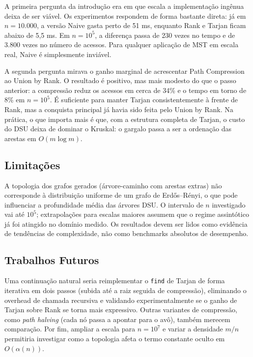 \documentclass[12pt]{article}
\begin{document}
A primeira pergunta da introdução era em que escala a implementação ingênua deixa de ser viável. Os experimentos respondem de forma bastante direta: já em $n = 10.000$, a versão Naive gasta perto de 51 ms, enquanto Rank e Tarjan ficam abaixo de 5,5 ms. Em $n = 10^5$, a diferença passa de 230 vezes no tempo e de 3.800 vezes no número de acessos. Para qualquer aplicação de MST em escala real, Naive é simplesmente inviável.

A segunda pergunta mirava o ganho marginal de acrescentar Path Compression ao Union by Rank. O resultado é positivo, mas mais modesto do que o passo anterior: a compressão reduz os acessos em cerca de 34\% e o tempo em torno de 8\% em $n = 10^5$. É suficiente para manter Tarjan consistentemente à frente de Rank, mas a conquista principal já havia sido feita pelo Union by Rank. Na prática, o que importa mais é que, com a estrutura completa de Tarjan, o custo do DSU deixa de dominar o Kruskal: o gargalo passa a ser a ordenação das arestas em $O(m \log m)$.

\subsection*{Limitações}

A topologia dos grafos gerados (árvore-caminho com arestas extras) não corresponde à distribuição uniforme de um grafo de Erd\H{o}s--R\'enyi, o que pode influenciar a profundidade média das árvores DSU. O intervalo de $n$ investigado vai até $10^5$; extrapolações para escalas maiores assumem que o regime assintótico já foi atingido no domínio medido. Os resultados devem ser lidos como evidência de tendências de complexidade, não como benchmarks absolutos de desempenho.

\subsection*{Trabalhos Futuros}

Uma continuação natural seria reimplementar o \texttt{find} de Tarjan de forma iterativa em dois passos (subida até a raiz seguida de compressão), eliminando o overhead de chamada recursiva e validando experimentalmente se o ganho de Tarjan sobre Rank se torna mais expressivo. Outras variantes de compressão, como \textit{path halving} (cada nó passa a apontar para o avô), também merecem comparação. Por fim, ampliar a escala para $n = 10^7$ e variar a densidade $m/n$ permitiria investigar como a topologia afeta o termo constante oculto em $O(\alpha(n))$.
\end{document}
